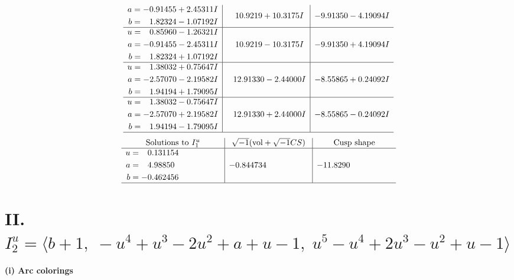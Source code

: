 \documentclass[1p]{elsarticle_modified}
\theoremstyle{definition}
\newcommand{\I}{\sqrt{-1}}
\begin{document}
$$\begin{array}{c|c|c}
\begin{aligned}
a &= -0.91455 + 2.45311 I \\
b &= \phantom{-}1.82324 - 1.07192 I\end{aligned}
 & \phantom{-}10.9219 + 10.3175 I & -9.91350 - 4.19094 I \\ \hline\begin{aligned}
u &= \phantom{-}0.85960 - 1.26321 I \\
a &= -0.91455 - 2.45311 I \\
b &= \phantom{-}1.82324 + 1.07192 I\end{aligned}
 & \phantom{-}10.9219 - 10.3175 I & -9.91350 + 4.19094 I \\ \hline\begin{aligned}
u &= \phantom{-}1.38032 + 0.75647 I \\
a &= -2.57070 - 2.19582 I \\
b &= \phantom{-}1.94194 + 1.79095 I\end{aligned}
 & \phantom{-}12.91330 - 2.44000 I & -8.55865 + 0.24092 I \\ \hline\begin{aligned}
u &= \phantom{-}1.38032 - 0.75647 I \\
a &= -2.57070 + 2.19582 I \\
b &= \phantom{-}1.94194 - 1.79095 I\end{aligned}
 & \phantom{-}12.91330 + 2.44000 I & -8.55865 - 0.24092 I\\
 \hline 
 \end{array}$$\newpage$$\begin{array}{c|c|c}  
\text{Solutions to }I^u_{1}& \I (\text{vol} + \sqrt{-1}CS) & \text{Cusp shape}\\
 \hline 
\begin{aligned}
u &= \phantom{-}0.131154\phantom{ +0.000000I} \\
a &= \phantom{-}4.98850\phantom{ +0.000000I} \\
b &= -0.462456\phantom{ +0.000000I}\end{aligned}
 & -0.844734\phantom{ +0.000000I} & -11.8290\phantom{ +0.000000I}\\
 \hline 
 \end{array}$$\newpage\newpage\renewcommand{\arraystretch}{1}
\centering \section*{II. $I^u_{2}= \langle b+1,\;- u^4+u^3-2 u^2+a+u-1,\;u^5- u^4+2 u^3- u^2+u-1 \rangle$}
\flushleft \textbf{(i) Arc colorings}\\
\end{document}

